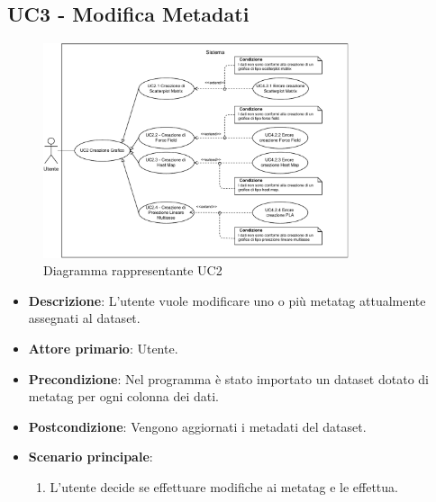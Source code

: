 \newpage
\subsection{UC3 - Modifica Metadati}
\label{sub:uc2}

\begin{figure}[h]
    \centering
    \includegraphics[width=0.8\textwidth]{componenti/casi-duso/diagrammi/UC2.pdf}
    \caption{Diagramma rappresentante UC2}
    \label{fig:UC2}
\end{figure}


\begin{itemize}
    \item \textbf{Descrizione}: L’utente vuole modificare uno o più metatag attualmente assegnati al dataset.
	
    \item \textbf{Attore primario}: Utente.
    
    \item \textbf{Precondizione}:   Nel programma è stato importato un dataset dotato di metatag per ogni
                                    colonna dei dati.

    \item \textbf{Postcondizione}:  Vengono aggiornati i metadati del dataset.

	\item \textbf{Scenario principale}:
		\begin{enumerate}
			\item L'utente decide se effettuare modifiche ai metatag e le effettua.
        \end{enumerate}

\end{itemize}
